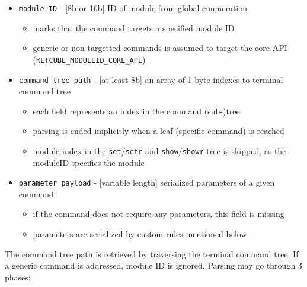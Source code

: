 
\begin{itemize}
	\item \texttt{module ID} - [8b or 16b] ID of module from global enumeration
		\begin{itemize}
			\item marks that the command targets a specified module ID
			\item generic or non-targetted commands is assumed to target the core API (\texttt{KETCUBE\_MODULEID\_CORE\_API})
		\end{itemize}
	\item \texttt{command tree path} - [at least 8b] an array of 1-byte indexes to terminal command tree
		\begin{itemize}
			\item each field represents an index in the command (sub-)tree
			\item parsing is ended implicitly when a leaf (specific command) is reached
			\item module index in the \texttt{set}/\texttt{setr} and \texttt{show}/\texttt{showr} tree is skipped, as the moduleID specifies the module
		\end{itemize}
	\item \texttt{parameter payload} - [variable length] serialized parameters of a given command
		\begin{itemize}
			\item if the command does not require any parameters, this field is missing
			\item parameters are serialized by custom rules mentioned below
		\end{itemize}
\end{itemize}

The command tree path is retrieved by traversing the terminal command tree. If a generic command is addressed, module ID is ignored. Parsing may go through 3 phases:

